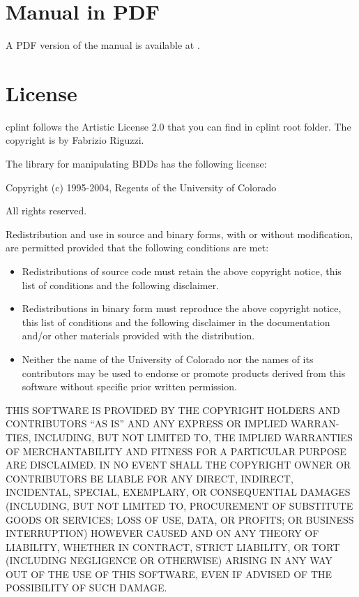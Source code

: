 \documentclass[letterpaper,10pt,english]{sphinxmanual}
\begin{document}
\chapter{Manual in PDF}
\label{\detokenize{index:manual-in-pdf}}
A PDF version of the manual is available at .


\chapter{License}
\label{\detokenize{index:license}}
cplint follows the Artistic License 2.0 that you can find in cplint root folder.
The copyright is by Fabrizio Riguzzi.

The library  for manipulating BDDs has the following license:

Copyright (c) 1995-2004, Regents of the University of Colorado

All rights reserved.

Redistribution and use in source and binary forms, with or without
modification, are permitted provided that the following conditions
are met:
\begin{itemize}
\item {} 
Redistributions of source code must retain the above copyright notice, this list of conditions and the following disclaimer.

\item {} 
Redistributions in binary form must reproduce the above copyright notice, this list of conditions and the following disclaimer in the documentation and/or other materials provided with the distribution.

\item {} 
Neither the name of the University of Colorado nor the names of its contributors may be used to endorse or promote products derived from this software without specific prior written permission.

\end{itemize}

THIS SOFTWARE IS PROVIDED BY THE COPYRIGHT HOLDERS AND CONTRIBUTORS
“AS IS” AND ANY EXPRESS OR IMPLIED WARRAN-TIES, INCLUDING, BUT NOT
LIMITED TO, THE IMPLIED WARRANTIES OF MERCHANTABILITY AND FITNESS
FOR A PARTICULAR PURPOSE ARE DISCLAIMED. IN NO EVENT SHALL THE
COPYRIGHT OWNER OR CONTRIBUTORS BE LIABLE FOR ANY DIRECT, INDIRECT,
INCIDENTAL, SPECIAL, EXEMPLARY, OR CONSEQUENTIAL DAMAGES (INCLUDING,
BUT NOT LIMITED TO, PROCUREMENT OF SUBSTITUTE GOODS OR SERVICES;
LOSS OF USE, DATA, OR PROFITS; OR BUSINESS INTERRUPTION) HOWEVER
CAUSED
AND ON ANY THEORY OF LIABILITY, WHETHER IN CONTRACT, STRICT
LIABILITY, OR TORT (INCLUDING NEGLIGENCE OR OTHERWISE) ARISING IN
ANY WAY OUT OF THE USE OF THIS SOFTWARE, EVEN IF ADVISED OF THE
POSSIBILITY OF SUCH DAMAGE.
\end{document}
